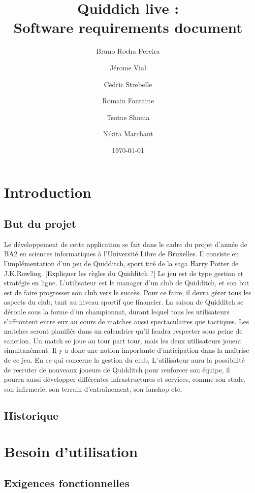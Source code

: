 \documentclass[a4paper]{article}
\title{Quiddich live : \\Software requirements document}
\author{Bruno Rocha Pereira \and Jérome Vial \and Cédric Strebelle \and
Romain Fontaine \and Tsotne Shonia \and Nikita Marchant}
\date{\today}
\begin{document}
\maketitle

\section{Introduction}
\subsection{But du projet}
Le développement de cette application se fait dans le cadre du projet d'année de BA2 en sciences informatiques à l'Université Libre de Bruxelles. Il consiste en l'implémentation d'un jeu de Quidditch, sport tiré de la saga Harry Potter de J.K.Rowling. 
[Expliquer les règles du Quidditch ?]
Le jeu est de type gestion et stratégie en ligne. L'\gls{utilisateur} est le manager d'un club de Quidditch, et son but est de faire progresser son club vers le succès. Pour ce faire, il devra gérer tous les aspects du club, tant au niveau sportif que financier. La saison de Quidditch se déroule sous la forme d'un championnat, durant lequel tous les \glspl{utilisateur} s'affrontent entre eux au cours de matches aussi spectaculaires que tactiques. Les matches seront planifiés dans un calendrier qu'il faudra respecter sous peine de sanction. Un match se joue au tour part tour, mais les deux \glspl{utilisateur} jouent simultanément. Il y a donc une notion importante d'anticipation dans la maîtrise de ce jeu. En ce qui concerne la gestion du club, L'\gls{utilisateur} aura la possibilité de recruter de nouveaux joueurs de Quidditch pour renforcer son équipe, il pourra aussi développer différentes infrastructures et services, comme son stade, son infirmerie, son terrain d'entraînement, son fanshop etc.

\printglossary[numberedsection]
\subsection{Historique}

\section{Besoin d'utilisation}
\subsection{Exigences fonctionnelles}
\end{document}
